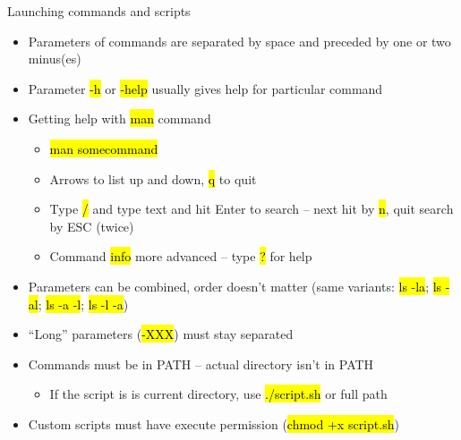 \documentclass[compress, ucs, xelatex, 11pt, xcolor=svgnames,
  hyperref={
    bookmarks=true,
    unicode=true,
    colorlinks=true,
    pdftitle={Linux, command line and MetaCentrum},
    plainpages=false,
    pdfauthor={Vojtech Zeisek},
    pdfsubject={Course about use of Linux command line, writing shell scripts and using MetaCentrum of CESNET},
    pdfcreator={XeLaTeX},
    pdfkeywords={Linux, GNU, BASH, shell, command line, MetaCentrum},
    linkcolor=Red,
    anchorcolor=Blue,
    citecolor=Purple,
    filecolor=DodgerBlue,
    menucolor=DarkOrchid,
    urlcolor=DeepSkyBlue,
    pdftex},
  url={hyphens, lowtilde} %
  ]{beamer}
\renewcommand{\texttt}[1]{\hl{\ttfamily #1}}
\begin{document}
\begin{frame}{Launching commands and scripts}
\begin{itemize}
  \item Parameters of commands are separated by space and preceded by one or two minus(es)
  \item Parameter \texttt{-h} or \texttt{{-}-help} usually gives help for particular command
  \item Getting help with \texttt{man} command
  \begin{itemize}
    \item \texttt{man somecommand}
    \item Arrows to list up and down, \texttt{q} to quit
    \item Type \texttt{/} and type text and hit Enter to search -- next hit by \texttt{n}, quit search by ESC (twice)
    \item Command \texttt{info} more advanced -- type \texttt{?} for help
  \end{itemize}
  \item Parameters can be combined, order doesn't matter (same variants: \texttt{ls -la}; \texttt{ls -al}; \texttt{ls -a -l}; \texttt{ls -l -a})
  \item ``Long'' parameters (\texttt{{-}-XXX}) must stay separated
  \item Commands must be in PATH -- actual directory isn't in PATH
  \begin{itemize}
    \item If the script is is current directory, use \texttt{./script.sh} or full path
  \end{itemize}
  \item Custom scripts must have execute permission (\texttt{chmod +x script.sh})
\end{itemize}
\end{frame}
\end{document}
